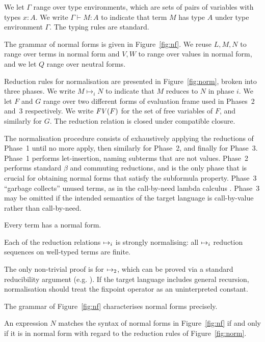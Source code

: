 We let $\Gamma$ range over type environments, which are sets of pairs
of variables with types $x:A$. We write $\Gamma \vdash M:A$ to
indicate that term $M$ has type $A$ under type environment
$\Gamma$. The typing rules are standard.

The grammar of normal forms is given in Figure~\ref{fig:nf}. We reuse
$L,M,N$ to range over terms in normal form and $V,W$ to range over
values in normal form, and we let $Q$ range over neutral forms.

Reduction rules for normalisation are presented in
Figure~\ref{fig:norm}, broken into three phases. We write $M
\mapsto_i N$ to indicate that $M$ reduces to $N$ in phase $i$. We let
$F$ and $G$ range over two different forms of evaluation frame used in
Phases~2 and~3 respectively. We write $\text{\textit{FV}}(F)$ for the set of free
variables of $F$, and similarly for $G$.
The reduction relation is closed under compatible closure.

\figterm
\fignf
\fignorm

The normalisation procedure consists of exhaustively applying
the reductions of Phase~1 until no more apply, then similarly for
Phase~2, and finally for Phase~3. Phase~1 performs let-insertion,
naming subterms that are not values.
Phase~2 performs standard $\beta$ and commuting reductions, and is the
only phase that is crucial for obtaining normal forms that satisfy the
subformula property. Phase~3 ``garbage collects'' unused terms, as in
the call-by-need lambda calculus \citep{call-by-need}. Phase~3 may be
omitted if the intended semantics of the target language is
call-by-value rather than call-by-need.

Every term has a normal form.
\begin{proposition}
Each of the reduction relations $\mapsto_{i}$ is strongly
normalising: all $\mapsto_{i}$ reduction sequences on well-typed
terms are finite.
\end{proposition}
The only non-trivial proof is for $\mapsto_{2}$, which can be
proved via a standard reducibility argument
(e.g. \cite{Lindley07}). If the target language includes general
recursion, normalisation should treat the fixpoint operator as an
uninterpreted constant.

The grammar of Figure~\ref{fig:nf} characterises normal forms
precisely.
\begin{proposition}
\label{prop_normal}
An expression $N$ matches the syntax of normal forms in
Figure~\ref{fig:nf} if and only if it is in normal form with regard to
the reduction rules of Figure~\ref{fig:norm}.
\end{proposition}

